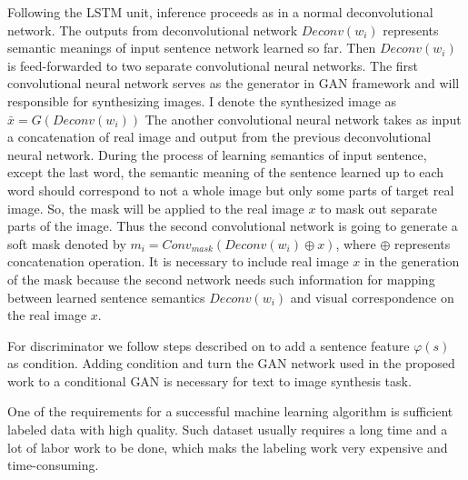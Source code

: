 \documentclass{iitthesis}
\begin{document}
Following the LSTM unit, inference proceeds as in a normal deconvolutional network. The outputs from deconvolutional network $Deconv(w_i)$ represents semantic meanings of input sentence network learned so far. Then $Deconv(w_i)$ is feed-forwarded to two separate convolutional neural networks. The first convolutional neural network serves as the generator in GAN framework and will responsible for synthesizing images. I denote the synthesized image as $\bar{x}=G(Deconv(w_i))$ The another convolutional neural network takes as input a concatenation of real image and output from the previous deconvolutional neural network. During the process of learning semantics of input sentence, except the last word,  the semantic meaning of the sentence learned up to each word should correspond to not a whole image but only some parts of target real image. So, the mask will be applied to the real image $x$ to mask out separate parts of the image. Thus the second convolutional network is going to generate a soft mask denoted by $m_i = Conv_{mask}(Deconv(w_i)\oplus x)$, where $\oplus$ represents concatenation operation. It is necessary to include real image $x$ in the generation of the mask because the second network needs such information for mapping between learned sentence semantics $Deconv(w_i)$ and visual correspondence on the real image $x$. 

For discriminator we follow steps described on \cite{reed2016generative} to add a sentence feature $\varphi(s)$ as condition. Adding condition and turn the GAN network used in the proposed work to a conditional GAN is necessary for text to image synthesis task. 

One of the requirements for a successful machine learning algorithm is sufficient labeled data with high quality. Such dataset usually requires a long time and a lot of labor work to be done, which maks the labeling work very expensive and time-consuming. 
\end{document}
